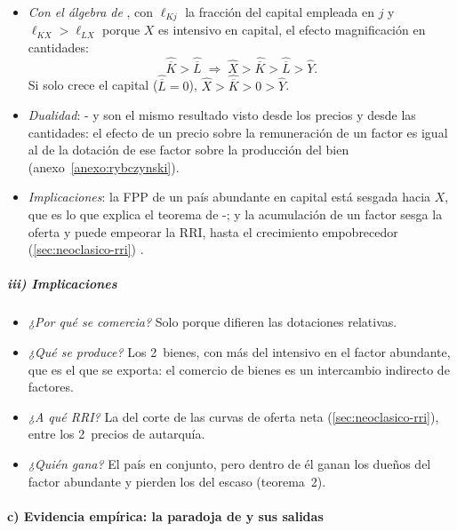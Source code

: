 \documentclass[11pt]{article}
\begin{document}
\begin{itemize}

\item \emph{Con el álgebra de }, con $\ell_{Kj}$ la fracción del capital empleada en $j$ y $\ell_{KX}>\ell_{LX}$ porque $X$ es intensivo en capital, el efecto magnificación en cantidades:
  \begin{equation}\label{eq:magnificacion-ryb}
  \hat{\overline K}>\hat{\overline L}\;\Longrightarrow\;\hat X>\hat{\overline K}>\hat{\overline L}>\hat Y.
  \end{equation}
  Si solo crece el capital ($\hat{\overline L}=0$), $\hat X>\hat{\overline K}>0>\hat Y$.
\item \emph{Dualidad}: - y  son el mismo resultado visto desde los precios y desde las cantidades: el efecto de un precio sobre la remuneración de un factor es igual al de la dotación de ese factor sobre la producción del bien\nocite{Samuelson1953Prices} (anexo~\ref{anexo:rybczynski}).
\item \emph{Implicaciones}: la FPP de un país abundante en capital está sesgada hacia $X$, que es lo que explica el teorema de -; y la acumulación de un factor sesga la oferta y puede empeorar la RRI, hasta el crecimiento empobrecedor (\ref{sec:neoclasico-rri}) .
\end{itemize}

\subparagraph{iii) Implicaciones}

\begin{itemize}

\item \emph{¿Por qué se comercia?} Solo porque difieren las dotaciones relativas.
\item \emph{¿Qué se produce?} Los 2~bienes, con más del intensivo en el factor abundante, que es el que se exporta: el comercio de bienes es un intercambio indirecto de factores.
\item \emph{¿A qué RRI?} La del corte de las curvas de oferta neta (\ref{sec:neoclasico-rri}), entre los 2~precios de autarquía.
\item \emph{¿Quién gana?} El país en conjunto, pero dentro de él ganan los dueños del factor abundante y pierden los del escaso (teorema~2).
\end{itemize}

\paragraph{c) Evidencia empírica: la paradoja de  y sus salidas}\label{sec:hos-evidencia}
\end{document}
